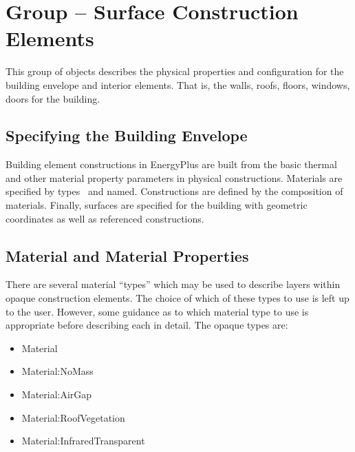 \section{Group -- Surface Construction Elements}\label{group-surface-construction-elements}

This group of objects describes the physical properties and configuration for the building envelope and interior elements. That is, the walls, roofs, floors, windows, doors for the building.

\subsection{Specifying the Building Envelope}\label{specifying-the-building-envelope}

Building element constructions in EnergyPlus are built from the basic thermal and other material property parameters in physical constructions. Materials are specified by types~ and named. Constructions are defined by the composition of materials. Finally, surfaces are specified for the building with geometric coordinates as well as referenced constructions.

\subsection{Material and Material Properties}\label{material-and-material-properties}

There are several material ``types'' which may be used to describe layers within opaque construction elements. The choice of which of these types to use is left up to the user. However, some guidance as to which material type to use is appropriate before describing each in detail. The opaque types are:

\begin{itemize}
\item
  Material
\item
  Material:NoMass
\item
  Material:AirGap
\item
  Material:RoofVegetation
\item
  Material:InfraredTransparent
\end{itemize}

